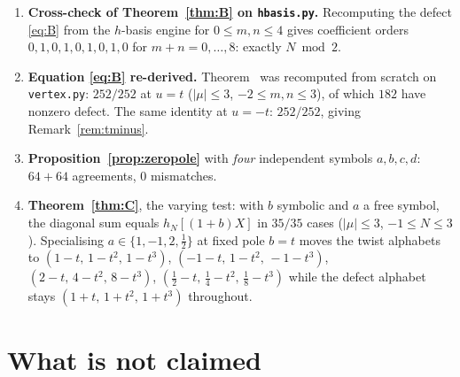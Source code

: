 \documentclass[11pt]{article}
\theoremstyle{definition}
\begin{document}
\begin{enumerate}
\item \textbf{Cross-check of Theorem~\ref{thm:B} on \texttt{hbasis.py}.}  Recomputing the
defect \eqref{eq:B} from the $h$-basis engine for $0\le m,n\le4$ gives coefficient orders
$0,1,0,1,0,1,0,1,0$ for $m+n=0,\dots,8$: exactly $N\bmod2$.

\item \textbf{Equation \eqref{eq:B} re-derived.}  Theorem~\cite[3.4]{Q99} was recomputed
from scratch on \texttt{vertex.py}: $252/252$ at $u=t$ ($|\mu|\le3$, $-2\le m,n\le3$), of
which $182$ have nonzero defect.  The same identity at $u=-t$: $252/252$, giving
Remark~\ref{rem:tminus}.

\item \textbf{Proposition~\ref{prop:zeropole}} with \emph{four} independent symbols
$a,b,c,d$: $64+64$ agreements, $0$ mismatches.

\item \textbf{Theorem~\ref{thm:C}}, the varying test: with $b$ symbolic and $a$ a free
symbol, the diagonal sum equals $h_N[(1+b)X]$ in $35/35$ cases ($|\mu|\le3$,
$-1\le N\le3$).  Specialising $a\in\{1,-1,2,\tfrac12\}$ at fixed pole $b=t$ moves the twist
alphabets to $(1-t,\,1-t^2,\,1-t^3)$, $(-1-t,\,1-t^2,\,-1-t^3)$, $(2-t,\,4-t^2,\,8-t^3)$,
$(\tfrac12-t,\,\tfrac14-t^2,\,\tfrac18-t^3)$ while the defect alphabet stays
$(1+t,\,1+t^2,\,1+t^3)$ throughout.
\end{enumerate}

\section{What is not claimed}
\end{document}
